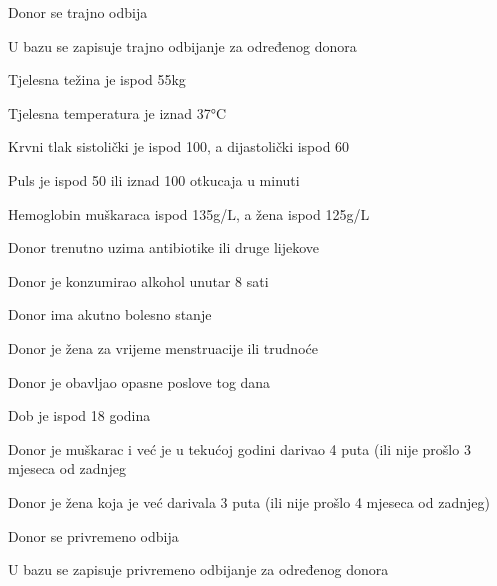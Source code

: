 \begin{packed_item}
\begin{packed_item}
\begin{packed_enum}
			\item Donor se trajno odbija
			\item U bazu se zapisuje trajno odbijanje za određenog donora
		\end{packed_enum}
\eject
		\item[6.b] {\item[]\begin{packed_item}
		\item[•]Tjelesna težina je ispod 55kg
		\item[•]Tjelesna temperatura je iznad 37°C 
		\item[•]Krvni tlak sistolički je ispod 100, a dijastolički ispod 60 
		\item[•]Puls je ispod 50 ili iznad 100 otkucaja u minuti 
		\item[•]Hemoglobin muškaraca ispod 135g/L, a žena ispod 125g/L
		\item[•]Donor trenutno uzima antibiotike ili druge lijekove      
		\item[•]Donor je konzumirao alkohol unutar 8 sati 
		\item[•]Donor ima akutno bolesno stanje
		\item[•]Donor je žena za vrijeme menstruacije ili trudnoće 
	    \item[•]Donor je obavljao opasne poslove tog dana
	    \item[•]Dob je ispod 18 godina
	    \item[•]Donor je muškarac i već je u tekućoj godini darivao 4 puta (ili nije prošlo 3 mjeseca od zadnjeg
	    \item[•]Donor je žena koja je već darivala 3 puta (ili nije prošlo 4 mjeseca od zadnjeg)\end{packed_item}}
		\item[] \begin{packed_enum}
			
			\item Donor se privremeno odbija
			\item U bazu se zapisuje privremeno odbijanje za određenog donora
			\end{packed_enum}
		
		
	\end{packed_item}
	
\end{packed_item}
\eject 

